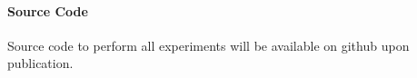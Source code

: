 \documentclass[letterpaper]{article}
\def\ie{i.e.\ }
\newcommand{\procedurename}{ABCD}
\begin{document}



\paragraph{Source Code}
Source code to perform all experiments will be available on github upon publication.


\end{document}
